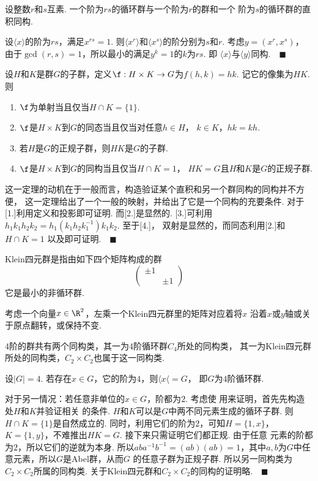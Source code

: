   \begin{pos}[循环群的分解]
    设整数$r$和$s$互素. 一个阶为$rs$的循环群与一个阶为$r$的群和一个
    阶为$s$的循环群的直积同构.
  \end{pos}
  \proof
    设$\langle x\rangle$的阶为$rs$，满足$x^{rs}=1$. 则$\langle x^r
    \rangle$和$\langle x^s\rangle$的阶分别为$s$和$r$. 考虑$y=(x^r,x^s)$，
    由于$\gcd(r, s)=1$，所以最小的满足$y^k=1$的$k$为$rs$. 即
    $\langle x\rangle$与$\langle y\rangle$同构.$\quad\blacksquare$

  \begin{thm}[直积的同构]
    \label{thm: 直积的同构}
    设$H$和$K$是群$G$的子群，定义$\f:H\times K\to G$为$f(h, k)=hk$.
    记它的像集为$HK$. 则
    \begin{enumerate}
      \item $\f$为单射当且仅当$H\cap K=\{1\}$.
      \item $\f$是$H\times K$到$G$的同态当且仅当对任意$h\in H$，
        $k\in K$，$hk=kh$.
      \item 若$H$是$G$的正规子群，则$HK$是$G$的子群.
      \item $\f$是$H\times K$到$G$的同构当且仅当$H\cap K=1$，
        $HK=G$且$H$和$K$是$G$的正规子群.
    \end{enumerate}
  \end{thm}
  \remark
    这一定理的动机在于一般而言，构造验证某个直积和另一个群同构的同构并不方便，
    这一定理给出了一个一般的映射，并给出了它是一个同构的充要条件.
  \proof
    对于[1.]利用定义和投影即可证明. 而[2.]是显然的. [3.]可利用
    $h_1k_1h_2k_2 = h_1(k_1h_2k_1^{-1})k_1k_2$. 至于[4.]，
    双射是显然的，而同态利用[2.]和$H\cap K = 1$
    以及即可证明.$\quad\blacksquare$

  \begin{defi}[Klein四元群]
    Klein四元群是指由如下四个矩阵构成的群
    \[
      \begin{pmatrix}
        \pm 1 & \\
        & \pm 1
      \end{pmatrix}
    \]
    它是最小的非循环群.
  \end{defi}
  \remark
    考虑一个向量$x\in\R^2$，左乘一个Klein四元群里的矩阵对应着将$x$
    沿着$x$或$y$轴或关于原点翻转，或保持不变.

  \begin{thm}[$4$阶的群]
    $4$阶的群共有两个同构类，其一为$4$阶循环群$C_4$所处的同构类，
    其一为Klein四元群所处的同构类，$C_2\times C_2$也属于这一同构类.
  \end{thm}
  \proof
    设$|G|=4$. 若存在$x\in G$，它的阶为$4$，则$\langle x\langle=G$，
    即$G$为$4$阶循环群. \par
    对于另一情况：若任意非单位的$x\in G$，阶都为$2$. 考虑使
    用来证明，首先先构造处$H$和$K$并验证相关
    的条件. $H$和$K$可以是$G$中两不同元素生成的循环子群. 则$H\cap K=
    \{1\}$是自然成立的. 同时，利用它们的阶为$2$，可知$H=\{1,x\}$，
    $K=\{1, y\}$，不难推出$HK=G$. 接下来只需证明它们都正规. 由于任意
    元素的阶都为$2$，所以它们的逆就为本身. 所以$aba^{-1}b^{-1}=
    (ab)(ab)=1$，其中$a,b$为$G$中任意元素，所以$G$是Abel群，从而$G$
    的任意子群为正规子群. 所以另一同构类为$C_2\times C_2$所属的同构类.
    关于Klein四元群和$C_2\times C_2$的同构的证明略.$\quad\blacksquare$

